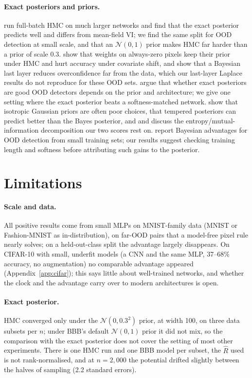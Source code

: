 \documentclass[10pt]{article}
\begin{document}
\paragraph{Exact posteriors and priors.} \citet{izmailov2021what} run
full-batch HMC on much larger networks and find that the exact posterior
predicts well and differs from mean-field VI; we find the same split for OOD
detection at small scale, and that an $\mathcal N(0,1)$ prior makes HMC far
harder than a prior of scale 0.3. \citet{izmailov2021dangers} show that
weights on always-zero pixels keep their prior under HMC and hurt
accuracy under covariate shift, and \citet{kristiadi2020being} show that a
Bayesian last layer reduces overconfidence far from the data, which our
last-layer Laplace results do not reproduce for these OOD sets.
\citet{henning2021bayesian} argue that whether
exact posteriors are good OOD detectors depends on the prior and
architecture; we give one setting where the exact posterior beats a
softness-matched network. \citet{fortuin2022priors} show that isotropic
Gaussian priors are often poor choices, \citet{wenzel2020good} that tempered
posteriors can predict better than the Bayes posterior, and
\citet{depeweg2018decomposition} and \citet{wimmer2023quantifying} discuss the
entropy/mutual-information decomposition our two scores rest on.
\citet{raina2025ood} report Bayesian advantages for OOD detection from small
training sets; our results suggest checking training length and softness
before attributing such gains to the posterior.

\section{Limitations}\label{sec:limits}
\paragraph{Scale and data.} All positive results come from small MLPs on
MNIST-family data (MNIST or Fashion-MNIST as in-distribution), on far-OOD pairs
that a model-free pixel rule nearly solves; on a held-out-class split the
advantage largely disappears. On CIFAR-10 with small, underfit models (a CNN and the
same MLP, 37--68\% accuracy, no augmentation) no comparable advantage
appeared (Appendix~\ref{app:cifar}); this says little about well-trained
networks, and whether the clock and the advantage carry over to modern
architectures is open.
\paragraph{Exact posterior.} HMC converged only under the $\mathcal N(0,0.3^2)$
prior, at width 100, on three data subsets per $n$; under BBB's default
$\mathcal N(0,1)$ prior it did not mix, so the comparison with the exact
posterior does not cover the setting of most other experiments. There is one
HMC run and one BBB model per subset, the $\hat R$ used is not
rank-normalised, and at $n=2{,}000$ the potential drifted slightly between the
halves of sampling (2.2 standard errors).
\end{document}
